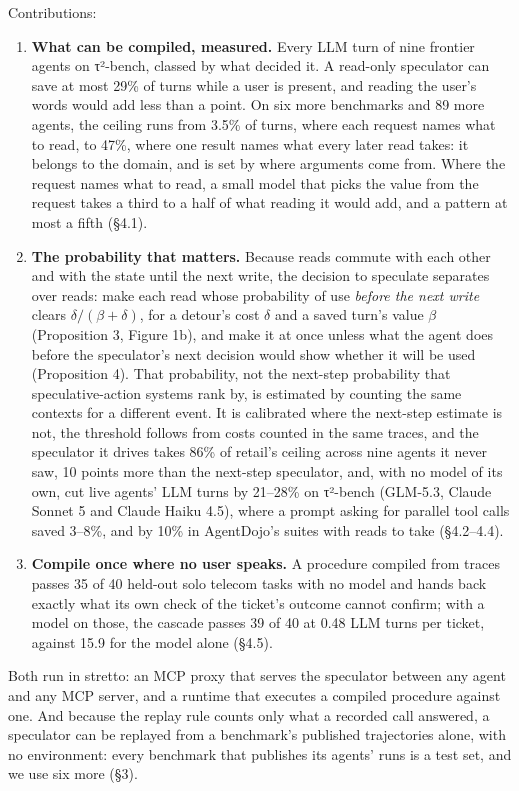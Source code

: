 \documentclass[10pt,twocolumn,letterpaper]{article}
\providecommand{\tightlist}{\setlength{\itemsep}{0pt}\setlength{\parskip}{0pt}}
\newcommand{\runin}[1]{{\sffamily\bfseries\color{accent}#1}}
\begin{document}
Contributions:

\begin{enumerate}
\def\labelenumi{\arabic{enumi}.}
\tightlist
\item
  \runin{What can be compiled, measured.} Every LLM turn of nine frontier agents on τ²-bench, classed by what decided it. A read-only speculator can save at most 29\% of turns while a user is present, and reading the user's words would add less than a point. On six more benchmarks and 89 more agents, the ceiling runs from 3.5\% of turns, where each request names what to read, to 47\%, where one result names what every later read takes: it belongs to the domain, and is set by where arguments come from. Where the request names what to read, a small model that picks the value from the request takes a third to a half of what reading it would add, and a pattern at most a fifth (§4.1).
\item
  \runin{The probability that matters.} Because reads commute with each other and with the state until the next write, the decision to speculate separates over reads: make each read whose probability of use \emph{before the next write} clears \(\delta/(\beta+\delta)\), for a detour's cost \(\delta\) and a saved turn's value \(\beta\) (Proposition 3, Figure 1b), and make it at once unless what the agent does before the speculator's next decision would show whether it will be used (Proposition 4). That probability, not the next-step probability that speculative-action systems rank by, is estimated by counting the same contexts for a different event. It is calibrated where the next-step estimate is not, the threshold follows from costs counted in the same traces, and the speculator it drives takes 86\% of retail's ceiling across nine agents it never saw, 10 points more than the next-step speculator, and, with no model of its own, cut live agents' LLM turns by 21--28\% on τ²-bench (GLM-5.3, Claude Sonnet 5 and Claude Haiku 4.5), where a prompt asking for parallel tool calls saved 3--8\%, and by 10\% in AgentDojo's suites with reads to take (§4.2--4.4).
\item
  \runin{Compile once where no user speaks.} A procedure compiled from traces passes 35 of 40 held-out solo telecom tasks with no model and hands back exactly what its own check of the ticket's outcome cannot confirm; with a model on those, the cascade passes 39 of 40 at 0.48 LLM turns per ticket, against 15.9 for the model alone (§4.5).
\end{enumerate}

Both run in stretto: an MCP proxy that serves the speculator between any agent and any MCP server, and a runtime that executes a compiled procedure against one. And because the replay rule counts only what a recorded call answered, a speculator can be replayed from a benchmark's published trajectories alone, with no environment: every benchmark that publishes its agents' runs is a test set, and we use six more (§3).
\end{document}
